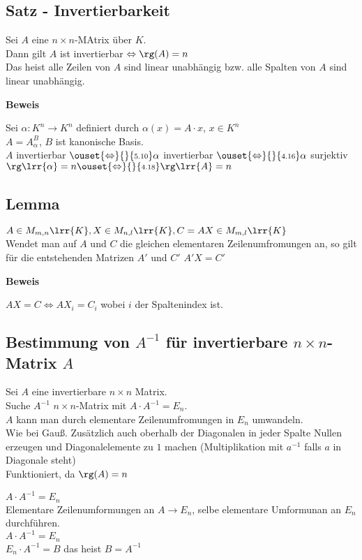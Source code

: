 \subsection{Satz - Invertierbarkeit}
	Sei $A$ eine $n\times n$-MAtrix über $K$.\\
	Dann gilt $A$ ist invertierbar $\Leftrightarrow\rg(A)=n$\\
	Das heist alle Zeilen von $A$ sind linear unabhängig bzw. alle Spalten von $A$ sind linear unabhängig.
	
	\textbf{Beweis}
	
	Sei $\alpha:K^n\rightarrow K^n$ definiert durch $\alpha(x)=A\cdot x$, $x\in K^n$\\
	$A=A_\alpha^B$, $B$ ist kanonische Basis.\\
	$A$ invertierbar $\ouset{\Leftrightarrow}{}{\mbox{\scriptsize 5.10}}\alpha$ invertierbar $\ouset{\Leftrightarrow}{}{\mbox{\scriptsize 4.16}}\alpha$ surjektiv $\rg\lrr{\alpha}=n\ouset{\Leftrightarrow}{}{\mbox{\scriptsize 4.18}}\rg\lrr{A}=n$
	
\subsection{Lemma}
	$A\in M_{m,n}\lrr{K}, X\in M_{n,l}\lrr{K}, C=AX\in M_{m,l}\lrr{K}$\\
	Wendet man auf $A$ und $C$ die gleichen elementaren Zeilenumfromungen an, so gilt für die entstehenden Matrizen $A'$ und $C'$ $A'X=C'$
	
	\textbf{Beweis}
	
	$AX=C\Leftrightarrow AX_i=C_i$ wobei $i$ der Spaltenindex ist.
	
\subsection{Bestimmung von \texorpdfstring{$A^{-1}$ für invertierbare $n\times n$- Matrix $A$}{invertierbarer Matrix}}
	Sei $A$ eine invertierbare $n\times n$ Matrix.\\
	Suche $A^{-1}$ $n\times n$-Matrix mit $A\cdot A^{-1}=E_n$.\\
	$A$ kann man durch elementare Zeilenumfromungen in $E_n$ umwandeln. \\
	Wie bei Gauß. Zusätzlich auch oberhalb der Diagonalen in jeder Spalte Nullen erzeugen und Diagonalelemente zu $1$ machen (Multiplikation mit $a^{-1}$ falls $a$ in Diagonale steht)\\
	Funktioniert, da $\rg(A)=n$
	
	$A\cdot A^{-1} =E_n$\\
	Elementare Zeilenumformungen an $A\rightarrow E_n$, selbe elementare Umformunan an $E_n$ durchführen.\\
	$A\cdot A^{-1} =E_n$\\
	$E_n\cdot A^{-1} = B$ das heist $B=A^{-1}$
	
